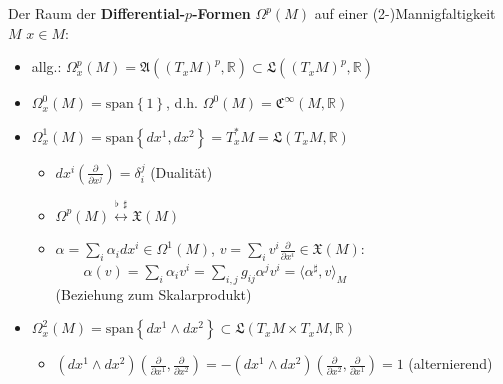 \documentclass{beamer}
\newcommand{\R}{\mathds{R}}
\begin{document}
  \begin{frame}
    \begin{block}{Der Raum der \textbf{Differential-\( p \)-Formen} \( \Omega^{p}(M) \) auf einer (2-)Mannigfaltigkeit \( M \)}
      \( x \in M \):
      \begin{itemize}
        \item allg.: \(\Omega^{p}_{x}(M) = \mathfrak{A}(\left( T_{x}M \right)^{p}, \R) \subset \mathfrak{L}(\left( T_{x}M \right)^{p}, \R) \)
        \item<2-> \( \Omega^{0}_{x}(M) = \text{span}\left\{ 1 \right\} \), d.h. \( \Omega^{0}(M) = \mathfrak{C}^{\infty}(M, \R)\)
        \item<3-> \( \Omega^{1}_{x}(M) = \text{span}\left\{ dx^{1}, dx^{2} \right\} = T_{x}^{*}M = \mathfrak{L}(T_{x}M, \R) \) 
        \begin{itemize}
          \item \( dx^{i}\left(\frac{\partial}{\partial x^{j}}\right) = \delta_{i}^{j} \) (Dualität)
          \item \(\Omega^{p}(M) \overset{\flat\ \ \sharp}{\longleftrightarrow} \mathfrak{X}(M)\)
          \item  \( \alpha = \sum_{i}\alpha_{i}dx^{i} \in \Omega^{1}(M) \), \( v = \sum_{i}v^{i}\frac{\partial}{\partial x^{i}} \in \mathfrak{X}(M)  \):\\
              \( \qquad \alpha(v) = \sum_{i}\alpha_{i}v^{i} = \sum_{i,j}g_{ij}\alpha^{j}v^{i} = \langle \alpha^{\sharp}, v \rangle_{M} \)\\
              (Beziehung zum Skalarprodukt)
        \end{itemize}
        \item<4-> \( \Omega^{2}_{x}(M) = \text{span}\left\{ dx^{1} \wedge dx^{2}\right\} \subset \mathfrak{L}(T_{x}M \times T_{x}M, \R) \)
        \begin{itemize}
          \item \( \left(dx^{1}\wedge dx^{2}\right) \left(\frac{\partial}{\partial x^{1}}, \frac{\partial}{\partial x^{2}}\right)
              = -\left(dx^{1}\wedge dx^{2}\right) \left(\frac{\partial}{\partial x^{2}}, \frac{\partial}{\partial x^{1}}\right) = 1 \)
              (alternierend)
        \end{itemize}
      \end{itemize}
    \end{block}
  \end{frame}
\end{document}
